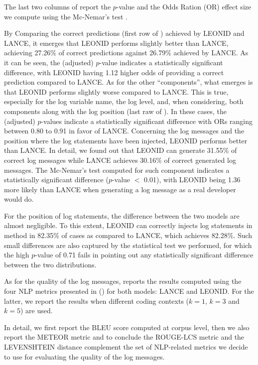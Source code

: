 The last two columns of  report the $p$-value and the Odds Ration (OR) effect size we compute using the Mc-Nemar's test \cite{mcnemar}.

By Comparing the correct predictions (\ie first row of ) achieved by LEONID and LANCE, it emerges that LEONID performs slightly better than LANCE, achieving 27.26\% of correct predictions against 26.79\% achieved by LANCE. As it can be seen, the (adjusted) $p$-value indicates a statistically significant difference, with LEONID having 1.12 higher odds of providing a correct prediction compared to LANCE. 
As for the other ``components'', what emerges is that LEONID performs slightly worse compared to LANCE.
This is true, especially for the log variable name, the log level, and, when considering, both components along with the log position (\ie last raw of ). 
In these cases, the (adjusted) $p$-values indicate a statistically significant difference with ORs ranging between 0.80 to 0.91 in favor of LANCE. Concerning the log messages and the position where the log statements have been injected, LEONID performs better than LANCE.
In detail, we found out that LEONID can generate 31.55\% of correct log messages while LANCE achieves 30.16\% of correct generated log messages. The Mc-Nemar's test computed for such component indicates a statistically significant difference ($p$-value $<$ 0.01), with LEONID being 1.36 more likely than LANCE when generating a log message as a real developer would do.

For the position of log statements, the difference between the two models are almost negligible. To this extent, LEONID can correctly injects log statements in \java method in 82.35\% of cases as compared to LANCE, which achieves 82.28\%. Such small differences are also captured by the statistical test we performed, for which the high $p$-value of 0.71 fails in pointing out any statistically significant difference between the two distributions.

As for the quality of the log messages,  reports the results computed using the four NLP metrics presented in () for both models: LANCE and LEONID. For the latter, we report the results when different coding contexts (\ie $k=1$, $k=3$ and $k=5$) are used. 

In detail, we first report the BLEU score computed at corpus level, then we also report the METEOR metric and to conclude the ROUGE-LCS metric and the LEVENSHTEIN distance complement the set of NLP-related metrics we decide to use for evaluating the quality of the log messages.

